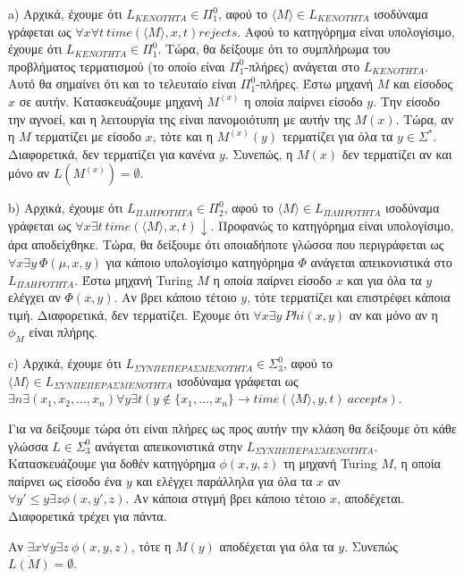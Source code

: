 \documentclass[a4paper, oneside, 11pt]{article}
\theoremstyle{definition}
\begin{document}
a) Αρχικά, έχουμε ότι $L_{KENOTHTA}\in \Pi_1^0$, αφού το $\langle M\rangle\in L_{KENOTHTA}$ ισοδύναμα γράφεται ως $\forall x\forall t\ time(\langle M\rangle,x,t) rejects$. 
Αφού το κατηγόρημα είναι υπολογίσιμο, έχουμε ότι $L_{KENOTHTA}\in \Pi_1^0$.
Τώρα, θα δείξουμε ότι το συμπλήρωμα του προβλήματος τερματισμού (το οποίο είναι $\Pi_1^0$-πλήρες) ανάγεται στο $L_{KENOTHTA}$. Αυτό θα σημαίνει ότι και το τελευταίο είναι 
$\Pi_1^0$-πλήρες. Έστω μηχανή $M$ και είσοδος $x$ σε αυτήν. Κατασκευάζουμε μηχανή $M^{(x)}$ η οποία παίρνει είσοδο $y$. Την είσοδο την αγνοεί, και η λειτουργία της είναι
πανομοιότυπη με αυτήν της $M(x)$. Τώρα, αν η $M$ τερματίζει με είσοδο $x$, 
τότε και η $M^{(x)}(y)$ τερματίζει για όλα τα $y\in\Sigma^*$. Διαφορετικά, δεν τερματίζει για κανένα $y$.
Συνεπώς, η $M(x)$ δεν τερματίζει αν και μόνο αν $L(M^{(x)})=\emptyset$.

b) Αρχικά, έχουμε ότι $L_{\Pi\Lambda HPOTHTA}\in \Pi_2^0$, αφού το $\langle M\rangle\in L_{\Pi\Lambda HPOTHTA}$ ισοδύναμα γράφεται ως
$\forall x\exists t\ time(\langle M\rangle, x,t)\downarrow$. Προφανώς το κατηγόρημα είναι υπολογίσιμο, άρα αποδείχθηκε.
Τώρα, θα δείξουμε ότι οποιαδήποτε γλώσσα που περιγράφεται ως $\forall x\exists y\ \Phi (\mu, x,y)$ για κάποιο υπολογίσιμο κατηγόρημα $\Phi$ ανάγεται απεικονιστικά στο
$L_{\Pi\Lambda HPOTHTA}$.
Έστω μηχανή Turing $M$ η οποία παίρνει είσοδο $x$ και για όλα τα $y$ ελέγχει αν $\Phi(x,y)$. Αν βρει κάποιο τέτοιο $y$, τότε τερματίζει και επιστρέφει κάποια τιμή.
Διαφορετικά, δεν τερματίζει. Έχουμε ότι $\forall x\exists y\ Phi(x,y)$ αν και μόνο αν η $\phi_M$ είναι πλήρης.

c) Αρχικά, έχουμε ότι $L_{\Sigma YN\Pi E\Pi EPA\Sigma MENOTHTA}\in \Sigma_3^0$, αφού το $\langle M\rangle \in L_{\Sigma YN\Pi E\Pi EPA\Sigma MENOTHTA}$ ισοδύναμα γράφεται
ως $\exists n \exists (x_1, x_2, ..., x_n)\forall y\exists t (y\notin \{x_1, ..., x_n\} \rightarrow time(\langle M\rangle, y, t)\ accepts)$.

Για να δείξουμε τώρα ότι είναι πλήρες ως προς αυτήν την κλάση θα δείξουμε ότι κάθε γλώσσα $L\in \Sigma_3^0$ ανάγεται απεικονιστικά στην $L_{\Sigma YN\Pi E\Pi EPA\Sigma MENOTHTA}$.
Κατασκευάζουμε για δοθέν κατηγόρημα $\phi(x,y,z)$ τη μηχανή Turing $M$, η οποία παίρνει ως είσοδο ένα $y$ και ελέγχει παράλληλα για όλα τα $x$ αν 
$\forall y'\leq y\exists z\phi(x,y',z)$.
Αν κάποια στιγμή βρει κάποιο τέτοιο $x$, αποδέχεται. Διαφορετικά τρέχει για πάντα.

Αν $\exists x\forall y\exists z\ \phi(x,y,z)$, τότε η $M(y)$ αποδέχεται για όλα τα $y$. Συνεπώς $\overline{L(M)}=\emptyset$.
\end{document}
